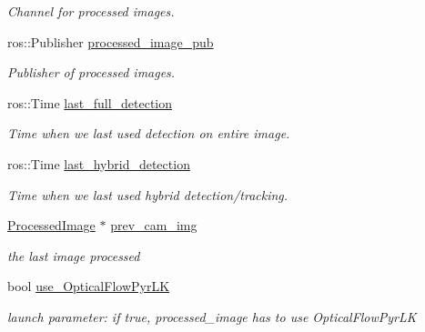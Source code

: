 \begin{DoxyCompactItemize}
\begin{DoxyCompactList}\small\item\em Channel for processed images. \end{DoxyCompactList}\item 
\mbox{\label{classImageProcessor_afe26c18f9619b6e98d63770dddfb6b15}} 
ros\+::\+Publisher \hyperlink{classImageProcessor_afe26c18f9619b6e98d63770dddfb6b15}{processed\+\_\+image\+\_\+pub}
\begin{DoxyCompactList}\small\item\em Publisher of processed images. \end{DoxyCompactList}\item 
\mbox{\label{classImageProcessor_a4440a56ed4a34a938ec8f63c5652ec02}} 
ros\+::\+Time \hyperlink{classImageProcessor_a4440a56ed4a34a938ec8f63c5652ec02}{last\+\_\+full\+\_\+detection}
\begin{DoxyCompactList}\small\item\em Time when we last used detection on entire image. \end{DoxyCompactList}\item 
\mbox{\label{classImageProcessor_a7b448fb86c393a1ed2174c705f5e0e31}} 
ros\+::\+Time \hyperlink{classImageProcessor_a7b448fb86c393a1ed2174c705f5e0e31}{last\+\_\+hybrid\+\_\+detection}
\begin{DoxyCompactList}\small\item\em Time when we last used hybrid detection/tracking. \end{DoxyCompactList}\item 
\mbox{\label{classImageProcessor_af7d65d14c5455a966287e730caebab91}} 
\hyperlink{classProcessedImage}{Processed\+Image} $\ast$ \hyperlink{classImageProcessor_af7d65d14c5455a966287e730caebab91}{prev\+\_\+cam\+\_\+img}
\begin{DoxyCompactList}\small\item\em the last image processed \end{DoxyCompactList}\item 
\mbox{\label{classImageProcessor_a2e2844af7d74f100c4290dde55a86750}} 
bool \hyperlink{classImageProcessor_a2e2844af7d74f100c4290dde55a86750}{use\+\_\+\+Optical\+Flow\+Pyr\+LK}
\begin{DoxyCompactList}\small\item\em launch parameter\+: if true, processed\+\_\+image has to use Optical\+Flow\+Pyr\+LK \end{DoxyCompactList}\item 

\end{DoxyCompactItemize}
